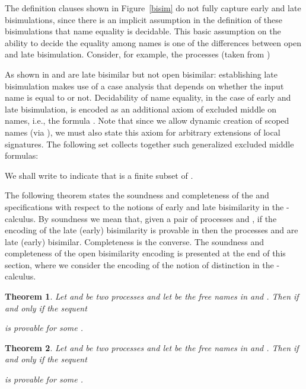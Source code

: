 \documentclass{acmtrans2m}
\newtheorem{theorem}{Theorem}
\begin{document}
The definition clauses shown in Figure~\ref{bisim} 
do not fully capture early and late bisimulations, since there is an
implicit assumption in the definition of these bisimulations that
name equality is decidable. This basic assumption on the ability to 
decide the equality among names is one of the differences between 
open and late bisimulation.  Consider,
for example,  the processes (taken from \cite{sangiorgi96acta})

As shown in \cite{sangiorgi96acta}  and  are late bisimilar but
not open bisimilar: establishing late bisimulation makes use 
of a case analysis that depends on
whether the input name  is equal to  or not.  
Decidability of name equality, in the case of early and late bisimulation,
is encoded as an additional axiom of excluded middle on names, i.e., 
the formula .
Note that since we allow dynamic creation of scoped names (via
), we must also state this axiom for arbitrary extensions of
local signatures.  The following set collects together such 
generalized excluded middle formulas:

We shall write  to indicate that  is a
finite subset of .


The following theorem states the soundness and completeness of the
 and  specifications with respect to the notions of early and 
late bisimilarity in the -calculus. By soundness we mean that, given a
pair of processes  and , if the encoding of the late (early)
bisimilarity is provable in  then the processes  and  are late (early) bisimilar.
Completeness is the converse.  The soundness and completeness of the
open bisimilarity encoding is presented at the end of this section, where we
consider the encoding of the notion of distinction in the -calculus.

\begin{theorem}
\label{thm:lbisim}
Let  and  be two processes and let  be
the free names in  and . 
Then  if and only if the sequent

is provable for some .
\end{theorem}


\begin{theorem}
\label{thm:ebisim}
Let  and  be two processes and let  be
the free names in  and . 
Then  if and only if the sequent

is provable for some .
\end{theorem}
\end{document}
